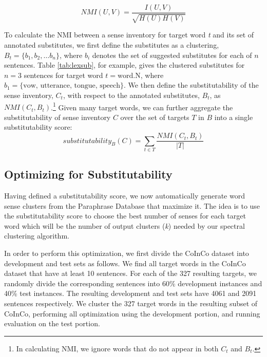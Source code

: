 \documentclass[11pt]{article}
\begin{document}
\[NMI(U,V) = \frac{I(U,V)}{\sqrt{H(U)H(V)}}\]

\noindent To calculate the NMI between a sense inventory for target word \textit{t} and its set of annotated substitutes, we first define the substitutes as a clustering, $B_t = \{b_1, b_2, \dots b_n\}$, where $b_i$ denotes the set of suggested substitutes for each of $n$ sentences. Table \ref{tab:lexsub}, for example, gives the clustered substitutes for $n=3$ sentences for target word $t=\text{word.N}$, where $b_1 = \{\text{vow, utterance, tongue, speech}\}$. We then define the substitutability of the sense inventory, $C_t$, with respect to the annotated substitutes, $B_t$, as $NMI(C_t, B_t)$.\footnote{In calculating NMI, we ignore words that do not appear in both $C_t$ and $B_t$.} Given many target words, we can further aggregate the substitutability of sense inventory $C$ over the set of targets $T$ in $B$ into a single substitutability score:
\[substitutability_B(C) = \sum_{t \in T} \frac{NMI(C_t, B_t)}{|T|}\]

\subsection{Optimizing for Substitutability}
\label{optim}

Having defined a substitutability score, we now automatically generate word sense clusters from the Paraphrase Database that maximize it. The idea is to use the substitutability score to choose the best number of senses for each target word which will be the number of output clusters (\textit{k}) needed by our spectral clustering algorithm. 

In order to perform this optimization, we first divide the CoInCo dataset into development and test sets as follows. We find all target words in the CoInCo dataset that have at least 10 sentences. For each of the 327 resulting targets, we randomly divide the corresponding sentences into 60\% development instances and 40\% test instances. The resulting development and test sets have 4061 and 2091 sentences respectively. We cluster the 327 target words in the resulting subset of CoInCo, performing all optimization using the development portion, and running evaluation on the test portion.
\end{document}
